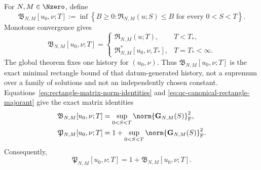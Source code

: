 \begin{definition}
\label{def:qc-canonical-majorants}
For \(N,M\in\Nzero\), define
\begin{equation}
 \mathfrak B_{N,M}[u_0,\nu;T]
 :=\inf\left\{B\ge0:
 \mathfrak R_{N,M}(u;S)\le B
 \text{ for every }0<S<T\right\}.
 \label{eq:qc-canonical-rectangle-majorant}
\end{equation}
Monotone convergence gives
\begin{equation}
 \mathfrak B_{N,M}[u_0,\nu;T]
 =\begin{cases}
   \mathfrak R_{N,M}(u;T),&T<T_*,\\
   \mathfrak R_{N,M}^*[u_0,\nu,T_*],&T=T_*<\infty.
  \end{cases}
 \label{eq:qc-canonical-rectangle-identification}
\end{equation}
The global theorem fixes one history for \((u_0,\nu)\).  Thus
\(\mathfrak B_{N,M}[u_0,\nu;T]\) is the exact minimal rectangle bound of
that datum-generated history, not a supremum over a family of solutions and
not an independently chosen constant.
Equations~\eqref{eq:rectangle-matrix-norm-identities} and
\eqref{eq:qc-canonical-rectangle-majorant} give the exact matrix identities
\begin{align}
 \mathfrak B_{N,M}[u_0,\nu;T]
 &=\sup_{0<S<T}\norm{\mathbf G_{N,M}(S)}_{\mathrm F}^2,
 \label{eq:qc-B-matrix-identity}\\
 \mathfrak P_{N,M}[u_0,\nu;T]
 &=1+\sup_{0<S<T}\norm{\mathbf G_{N,M}(S)}_{\mathrm F}^2.
 \label{eq:qc-P-matrix-identity}
\end{align}
Consequently,
\begin{equation}
 \mathfrak P_{N,M}[u_0,\nu;T]
 =1+\mathfrak B_{N,M}[u_0,\nu;T].
 \label{eq:qc-producer-through-B}
\end{equation}


\end{definition}
